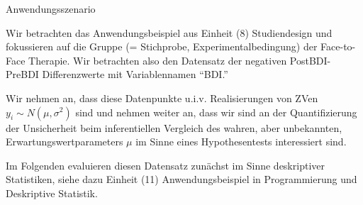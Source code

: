 \documentclass[
  8pt,
  ignorenonframetext,
]{beamer}
\begin{document}
\begin{frame}{Anwendungsszenario}
\protect\hypertarget{anwendungsszenario-1}{}
\small

Wir betrachten das Anwendungsbeispiel aus Einheit (8) Studiendesign und
fokussieren auf die Gruppe (= Stichprobe, Experimentalbedingung) der
Face-to-Face Therapie. Wir betrachten also den Datensatz der negativen
PostBDI-PreBDI Differenzwerte mit Variablennamen ``BDI.'' \vspace{4mm}

Wir nehmen an, dass diese Datenpunkte u.i.v. Realisierungen von ZVen
\(y_i \sim N(\mu,\sigma^2)\) sind und nehmen weiter an, dass wir sind an
der Quantifizierung der Unsicherheit beim inferentiellen Vergleich des
wahren, aber unbekannten, Erwartungswertparameters \(\mu\) im Sinne
eines Hypothesentests interessiert sind. \vspace{4mm}

Im Folgenden evaluieren diesen Datensatz zunächst im Sinne deskriptiver
Statistiken, siehe dazu Einheit (11) Anwendungsbeispiel in
Programmierung und Deskriptive Statistik.
\end{frame}
\end{document}
